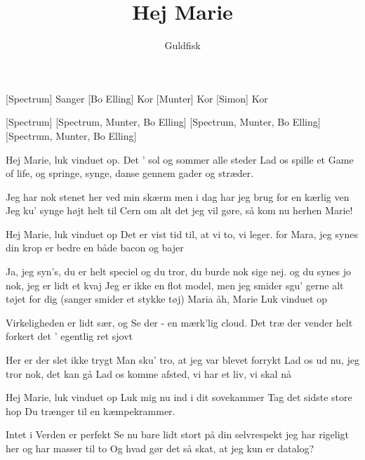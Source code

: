 \documentclass[a4paper,11pt]{article}
\title{Hej Marie}
\author{Guldfisk}
\begin{document}
\maketitle

\begin{roles}  
  [Spectrum] Sanger
  [Bo Elling] Kor
  [Munter] Kor
  [Simon] Kor
\end{roles}

\begin{props}
  [Spectrum]
  [Spectrum, Munter, Bo Elling]
  [Spectrum, Munter, Bo Elling]
  [Spectrum, Munter, Bo Elling]
\end{props}


\begin{song}
%
  Hej Marie, luk vinduet op.
  Det ' sol og sommer alle steder
  Lad os spille et Game of life,
  og springe, synge, danse gennem gader og stræder.

   Jeg har nok stenet her ved min skærm
  men i dag har jeg brug for en kærlig ven
  Jeg ku' synge højt helt til Cern
  om alt det jeg vil gøre, så kom nu herhen
  Marie!

   Hej Marie, luk vinduet op
  Det er vist tid til, at vi to, vi leger.
  for Mara, jeg synes din krop
  er bedre en både bacon og bajer

   Ja, jeg syn's, du er helt speciel
  og du tror, du burde nok sige nej.
  og du synes jo nok, jeg er lidt et kvaj
  Jeg er ikke en flot model, men
  jeg smider sgu' gerne alt tøjet for dig (sanger smider et stykke tøj)
  Maria
  åh, Marie
  Luk vinduet op

   Virkeligheden er lidt sær, og
  Se der - en mærk'lig cloud.
  Det træ der vender helt forkert
  det ' egentlig ret sjovt

   Her er der slet ikke trygt
  Man sku' tro, at jeg var blevet forrykt
  Lad os ud nu, jeg tror nok, det kan gå
  Lad os komme afsted, vi har et liv, vi skal nå


   Hej Marie, luk vinduet op
  Luk mig nu ind i dit sovekammer
  Tag det sidste store hop
  Du trænger til en kæmpekrammer.

   Intet i Verden er perfekt
  Se nu bare lidt stort på din selvrespekt
  jeg har rigeligt her og har masser til to
  Og hvad gør det så skat, at jeg kun er datalog?
\end{song}
\end{document}
